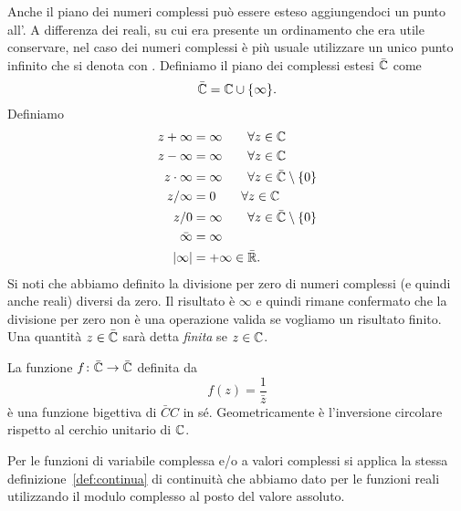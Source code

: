 Anche il piano dei numeri complessi può essere esteso aggiungendoci
un punto all'.
A differenza dei reali, su cui era presente un ordinamento che era utile conservare,
nel caso dei numeri complessi è più usuale utilizzare un unico punto infinito
che si denota con \myemph{$\infty$}.
Definiamo il piano dei complessi estesi $\bar {\mathbb C}$ come
\[
\bar {\mathbb C} = \mathbb C \cup {\left\{ \infty \right\}}.
\]
Definiamo
\begin{align*}
  z + \infty &= \infty \qquad \forall z \in \mathbb C\\
  z - \infty &= \infty \qquad \forall z \in \mathbb C\\
   z\cdot \infty &= \infty \qquad \forall z \in \bar{\mathbb C}\setminus{\left\{ 0 \right\}} \\
   z / \infty &= 0 \qquad \forall z \in \mathbb C \\
   z / 0 &= \infty \qquad \forall z \in \bar {\mathbb C} \setminus{\left\{ 0 \right\}}\\
   \bar \infty &= \infty \\
   {\left|\infty\right|} &= +\infty \in \bar {\mathbb R}.
\end{align*}
Si noti che abbiamo definito la divisione per zero di numeri complessi
(e quindi anche reali) diversi da zero. Il risultato è $\infty$ e quindi
rimane confermato che la divisione per zero non è una operazione valida
se vogliamo un risultato finito.
Una quantità $z\in \bar {\mathbb C}$ sarà detta \emph{finita} se $z\in \mathbb C$.

\begin{example}
  La funzione $f\colon \bar {\mathbb C} \to \bar {\mathbb C}$ 
  definita da 
  \[
  f(z) = \frac{1}{\bar z}
  \]
  è una funzione bigettiva di $\bar CC$ in sé.
  Geometricamente è l'inversione circolare rispetto 
  al cerchio unitario di $\mathbb C$.
\end{example}

Per le funzioni di variabile complessa e/o a valori complessi 
si applica la stessa definizione~\ref{def:continua} di continuità 
che abbiamo dato per le funzioni reali utilizzando il modulo 
complesso al posto del valore assoluto.
%
%


